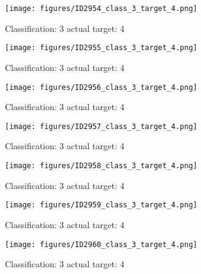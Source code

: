\begin{figure}[h!]
\begin{center}
\texttt{[image: figures/ID2954\_class\_3\_target\_4.png]}
\end{center}
\caption{ Classification: 3 actual target: 4}
\label{fig:ID2954_class_3_target_4}
\end{figure}
\begin{figure}[h!]
\begin{center}
\texttt{[image: figures/ID2955\_class\_3\_target\_4.png]}
\end{center}
\caption{ Classification: 3 actual target: 4}
\label{fig:ID2955_class_3_target_4}
\end{figure}
\begin{figure}[h!]
\begin{center}
\texttt{[image: figures/ID2956\_class\_3\_target\_4.png]}
\end{center}
\caption{ Classification: 3 actual target: 4}
\label{fig:ID2956_class_3_target_4}
\end{figure}
\begin{figure}[h!]
\begin{center}
\texttt{[image: figures/ID2957\_class\_3\_target\_4.png]}
\end{center}
\caption{ Classification: 3 actual target: 4}
\label{fig:ID2957_class_3_target_4}
\end{figure}
\begin{figure}[h!]
\begin{center}
\texttt{[image: figures/ID2958\_class\_3\_target\_4.png]}
\end{center}
\caption{ Classification: 3 actual target: 4}
\label{fig:ID2958_class_3_target_4}
\end{figure}
\begin{figure}[h!]
\begin{center}
\texttt{[image: figures/ID2959\_class\_3\_target\_4.png]}
\end{center}
\caption{ Classification: 3 actual target: 4}
\label{fig:ID2959_class_3_target_4}
\end{figure}
\begin{figure}[h!]
\begin{center}
\texttt{[image: figures/ID2960\_class\_3\_target\_4.png]}
\end{center}
\caption{ Classification: 3 actual target: 4}
\label{fig:ID2960_class_3_target_4}
\end{figure}
